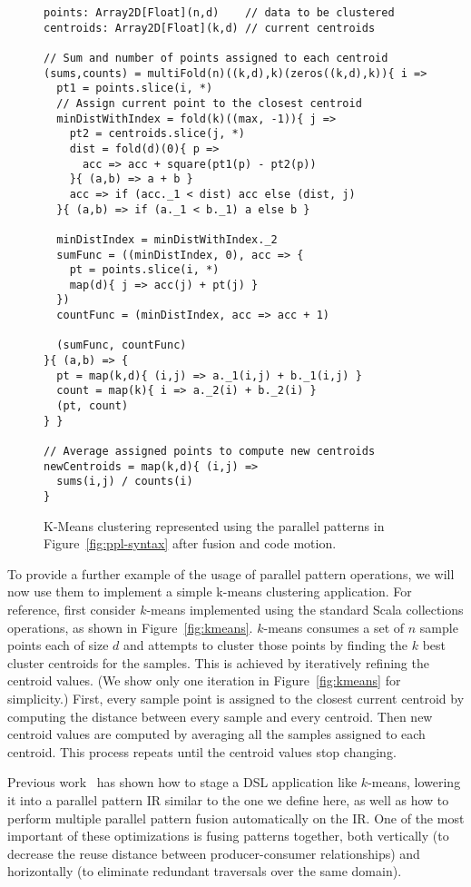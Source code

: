 \begin{figure}\centering
\begin{lstlisting}[language=ScalaBig]
points: Array2D[Float](n,d)    // data to be clustered
centroids: Array2D[Float](k,d) // current centroids

// Sum and number of points assigned to each centroid
(sums,counts) = multiFold(n)((k,d),k)(zeros((k,d),k)){ i =>
  pt1 = points.slice(i, *)
  // Assign current point to the closest centroid
  minDistWithIndex = fold(k)((max, -1)){ j =>
    pt2 = centroids.slice(j, *)
    dist = fold(d)(0){ p =>
      acc => acc + square(pt1(p) - pt2(p))
    }{ (a,b) => a + b }
    acc => if (acc._1 < dist) acc else (dist, j)
  }{ (a,b) => if (a._1 < b._1) a else b }

  minDistIndex = minDistWithIndex._2
  sumFunc = ((minDistIndex, 0), acc => {
    pt = points.slice(i, *)
    map(d){ j => acc(j) + pt(j) }
  })
  countFunc = (minDistIndex, acc => acc + 1)

  (sumFunc, countFunc)
}{ (a,b) => {
  pt = map(k,d){ (i,j) => a._1(i,j) + b._1(i,j) }
  count = map(k){ i => a._2(i) + b._2(i) }
  (pt, count)
} }

// Average assigned points to compute new centroids
newCentroids = map(k,d){ (i,j) =>
  sums(i,j) / counts(i)
}
\end{lstlisting}
\caption{K-Means clustering represented using the parallel patterns in Figure~\ref{fig:ppl-syntax} after fusion and code motion.}
\label{fig:kmeans-fused}
\end{figure}

To provide a further example of the usage of parallel pattern operations, we will now use them to
implement a simple k-means clustering application.
For reference, first consider $k$-means implemented using the standard Scala
collections operations, as shown in Figure~\ref{fig:kmeans}.
$k$-means consumes a set of $n$ sample points each of size $d$ and
attempts to cluster those points by finding the $k$ best cluster centroids for the samples.
This is achieved by iteratively refining the centroid values.
(We show only one iteration in Figure~\ref{fig:kmeans} for simplicity.)
First, every sample point is assigned to the closest current centroid by
computing the distance between every sample and every centroid.
Then new centroid values are computed by averaging all the samples assigned to each centroid.
This process repeats until the centroid values stop changing.

Previous work~\cite{rompf12optimizing,brown16clusters,chambers10flumejava} has shown how to stage a DSL application like $k$-means, lowering it into a parallel pattern IR similar to the one we define here, as well as how to perform multiple parallel pattern fusion automatically on the IR.
One of the most important of these optimizations is fusing patterns together, both vertically (to decrease the reuse distance between producer-consumer relationships) and horizontally (to eliminate redundant traversals over the same domain).

